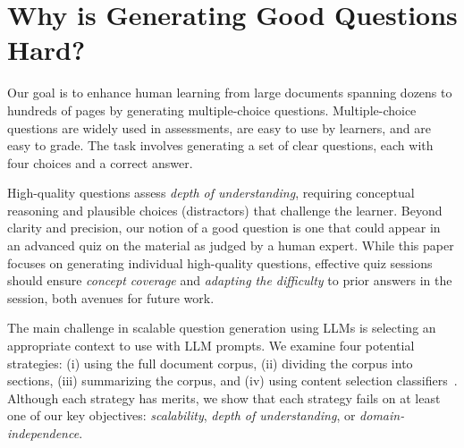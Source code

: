 \section{Why is Generating Good Questions Hard?}
\label{sec:insights}

Our goal is to enhance human learning from large documents spanning dozens to hundreds of pages by generating multiple-choice questions. Multiple-choice questions are widely used in assessments, are easy to use by learners, and are easy to grade. The task involves generating a set of clear questions, each with four  choices and a correct answer.

High-quality questions assess {\em depth of understanding}, requiring conceptual reasoning and plausible choices (distractors) that challenge the learner. Beyond clarity and precision, our notion of a good question is one that could appear in an advanced quiz on the material as judged by a human expert. While this paper focuses on generating individual high-quality questions, effective quiz sessions should ensure {\em concept coverage} and {\em adapting the difficulty} to prior answers in the session, both avenues for future work.


The main challenge in scalable question generation using LLMs is selecting an appropriate context to use with LLM prompts. We examine four potential strategies: (i) using the full document corpus, (ii) dividing the corpus into sections, (iii) summarizing the corpus, and (iv) using content selection classifiers~\citep{context_Steuer, Context_diverse_hadifar}. Although each strategy has merits, we show that each strategy fails on at least one of our key objectives: {\em scalability}, {\em depth of understanding}, or {\em domain-independence}.

\newcommand{\questionbox}[1]{%
    \colorbox{customblue}{\parbox{0.97\linewidth}{\vspace{1pt}\textbf{#1}\vspace{1pt}}}
}

